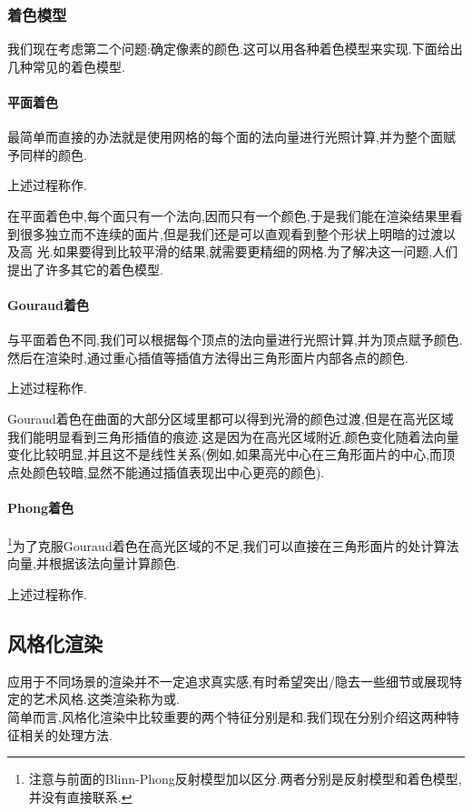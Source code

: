 \documentclass{ctexart}
\begin{document}
\subsubsection{着色模型}
我们现在考虑第二个问题:确定像素的颜色.这可以用各种着色模型来实现.下面给出几种常见的着色模型.
\paragraph{平面着色}
最简单而直接的办法就是使用网格的每个面的法向量进行光照计算,并为整个面赋予同样的颜色.
\begin{definition}[平面着色]
    上述过程称作.
\end{definition}
在平面着色中,每个面只有一个法向,因而只有一个颜色,于是我们能在渲染结果里看到很多独立而不连续的面片,但是我们还是可以直观看到整个形状上明暗的过渡以及高
光.如果要得到比较平滑的结果,就需要更精细的网格.为了解决这一问题,人们提出了许多其它的着色模型.
\paragraph{Gouraud着色}
与平面着色不同,我们可以根据每个顶点的法向量进行光照计算,并为顶点赋予颜色.然后在渲染时,通过重心插值等插值方法得出三角形面片内部各点的颜色.
\begin{definition}[Gouraud着色]
    上述过程称作.
\end{definition}
Gouraud着色在曲面的大部分区域里都可以得到光滑的颜色过渡,但是在高光区域我们能明显看到三角形插值的痕迹.这是因为在高光区域附近,颜色变化随着法向量变化比较明显,并且这不是线性关系(例如,如果高光中心在三角形面片的中心,而顶点处颜色较暗,显然不能通过插值表现出中心更亮的颜色).
\paragraph{Phong着色}\footnote{注意与前面的Blinn-Phong反射模型加以区分.两者分别是反射模型和着色模型,并没有直接联系.}为了克服Gouraud着色在高光区域的不足,我们可以直接在三角形面片的处计算法向量,并根据该法向量计算颜色.
\begin{definition}[Phong着色]
    上述过程称作.
\end{definition}
\subsection{风格化渲染}
应用于不同场景的渲染并不一定追求真实感,有时希望突出/隐去一些细节或展现特定的艺术风格.这类渲染称为或.\\
\indent 简单而言,风格化渲染中比较重要的两个特征分别是和.我们现在分别介绍这两种特征相关的处理方法.
\end{document}
